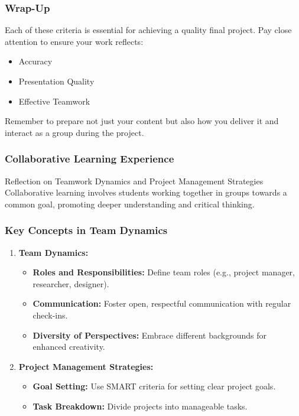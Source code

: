 \documentclass[aspectratio=169]{beamer}
\begin{document}
\begin{frame}[fragile]
    \frametitle{Wrap-Up}
    
    Each of these criteria is essential for achieving a quality final project. Pay close attention to ensure your work reflects:
    \begin{itemize}
        \item Accuracy
        \item Presentation Quality
        \item Effective Teamwork
    \end{itemize}
    Remember to prepare not just your content but also how you deliver it and interact as a group during the project.
\end{frame}

\begin{frame}[fragile]
    \frametitle{Collaborative Learning Experience}
    \begin{block}{Reflection on Teamwork Dynamics and Project Management Strategies}
        Collaborative learning involves students working together in groups towards a common goal, promoting deeper understanding and critical thinking.
    \end{block}
\end{frame}

\begin{frame}[fragile]
    \frametitle{Key Concepts in Team Dynamics}
    \begin{enumerate}
        \item \textbf{Team Dynamics:}
            \begin{itemize}
                \item \textbf{Roles and Responsibilities:} Define team roles (e.g., project manager, researcher, designer).
                \item \textbf{Communication:} Foster open, respectful communication with regular check-ins.
                \item \textbf{Diversity of Perspectives:} Embrace different backgrounds for enhanced creativity.
            \end{itemize}
        \item \textbf{Project Management Strategies:}
            \begin{itemize}
                \item \textbf{Goal Setting:} Use SMART criteria for setting clear project goals.
                \item \textbf{Task Breakdown:} Divide projects into manageable tasks.
            \end{itemize}
    \end{enumerate}
\end{frame}
\end{document}
